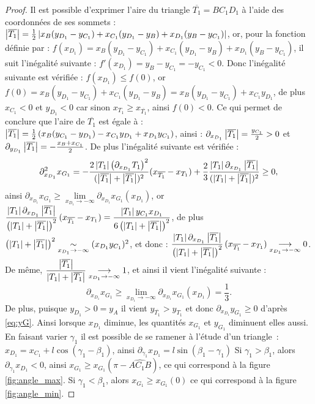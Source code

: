 \documentclass[12pt,a4paper]{article}
\begin{document}
\begin{proof}
		Il est possible d'exprimer l'aire du triangle $\overline{T_1} = BC_1D_1$ à l'aide des coordonnées de ses sommets : $\left\lvert \overline{T_1} \right\rvert = \frac12\left\lvert x_B(y_{D_1}-y_{C_1})+x_{C_1}(y_{D_1}-y_B)+x_{D_1}(y_B-y_{C_1}) \right\rvert$, or, pour la fonction définie par : $f(x_{D_1}) = x_B(y_{D_1}-y_{C_1})+x_{C_1}(y_{D_1}-y_B)+x_{D_1}(y_B-y_{C_1})$, il suit l'inégalité suivante : $f'(x_{D_1}) = y_B - y_{C_1} = -y_{C_1} < 0$. Donc l'inégalité suivante est vérifiée : $f(x_{D_1}) \leq f(0)$, or $ f(0) = x_B(y_{D_1}-y_{C_1})+x_{C_1}(y_{D_1}-y_B) = x_B(y_{D_1}-y_{C_1})+x_{C_1}y_{D_1}$, de plus $x_{C_1} < 0$ et $y_{D_1} < 0$ car sinon $x_{T_1} \geq x_{\overline{T_1}}$, ainsi $f(0) < 0$. Ce qui permet de conclure que l'aire de $\overline{T_1}$ est égale à : $\left\lvert \overline{T_1} \right\rvert = \frac12 \left(x_B(y_{C_1}-y_{D_1})-x_{C_1}y_{D_1}+x_{D_1}y_{C_1}\right)$, ainsi : $\partial_{x_{D_1}} \left\lvert \overline{T_1} \right\rvert = \frac{y_{C_1}}2 > 0$ et $\partial_{y_{D_1}} \left\lvert \overline{T_1} \right\rvert = -\frac{x_B+x_{C_1}}2$. De plus l'inégalité suivante est vérifiée :
		\[
			\partial_{x_{D_1}}^2 x_{G_1} = -\dfrac{2\left\lvert T_1 \right\rvert\left(\partial_{x_{D_1}} T_1\right)^2}{(\left\lvert \overline{T_1} \right\rvert+\left\lvert \overline{T_1} \right\rvert)^2}(x_{\overline{T_1}}-x_{T_1}) + \dfrac23 \dfrac{\left\lvert T_1 \right\rvert\partial_{x_{D_1}} \left\lvert \overline{T_1} \right\rvert}{(\left\lvert T_1 \right\rvert+\left\lvert \overline{T_1} \right\rvert)^2} \geq 0,
		\]
		ainsi $\partial_{x_{D_1}}x_{G_1} \geq \underset{x_{D_1} \to -\infty}\lim \partial_{x_{D_1}} x_{G_1}(x_{D_1})$, or $\dfrac{\left\lvert T_1 \right\rvert\partial_{x_{D_1}}\left\lvert \overline{T_1} \right\rvert}{\left(\left\lvert T_1 \right\rvert+\left\lvert \overline{T_1} \right\rvert\right)^2}\,(x_{\overline{T_1}}-x_{T_1}) = \dfrac{\left\lvert T_1 \right\rvert y_{C_1}x_{D_1}}{6\left(\left\lvert T_1 \right\rvert+\left\lvert \overline{T_1} \right\rvert\right)^2}$, de plus $\left(\left\lvert T_1 \right\rvert + \left\lvert \overline{T_1} \right\rvert\right)^2 \underset{x_{D_1}\to - \infty}\sim (x_{D_1}y_{C_1})^2$, et donc : $\dfrac{\left\lvert T_1 \right\rvert\partial_{x_{D_1}}\left\lvert \overline{T_1} \right\rvert}{\left(\left\lvert T_1 \right\rvert+\left\lvert \overline{T_1} \right\rvert\right)^2}\,(x_{\overline{T_1}}-x_{T_1}) \underset{x_{D_1} \to -\infty}\longrightarrow 0$. De même, $\dfrac{\left\lvert \overline{T_1} \right\rvert}{\left\lvert T_1 \right\rvert+\left\lvert \overline{T_1} \right\rvert} \underset{x_{D_1}\to -\infty}\longrightarrow 1$, et ainsi il vient l'inégalité suivante :
			\[
			\partial_{x_{D_1}}x_{G_1} \geq \underset{x_{D_1} \to -\infty}\lim \partial_{x_{D_1}} x_{G_1}(x_{D_1}) = \frac13.
			\]
			De plus, puisque $y_{D_1} > 0 = y_A$ il vient $y_{\overline{T_1}} > y_{T_1}$ et donc $\partial_{x_{D_1}} y_{G_1} \geq 0$ d'après \ref{eq:yG}. Ainsi lorsque $x_{D_1}$ diminue, les quantités $x_{G_1}$ et $y_{G_1}$ diminuent elles aussi. En faisant varier $\gamma_1$ il est possible de se ramener à l'étude d'un triangle : $x_{D_1} = x_{C_1} + l\cos(\gamma_1-\beta_1)$, ainsi $\partial_{\gamma_1} x_{D_1} = l\sin(\beta_1-\gamma_1)$ Si $\gamma_1 > \beta_1$, alors $\partial_{\gamma_1}x_{D_1} < 0$, ainsi $x_{G_1} \geq x_{G_1}(\pi-\widehat{AC_1B})$, ce qui correspond à la figure \ref{fig:angle_max}. Si $\gamma_1 < \beta_1$, alors $x_{G_1} \geq x_{G_1}(0)$ ce qui correspond à la figure \ref{fig:angle_min}.
				

\end{proof}
\end{document}

